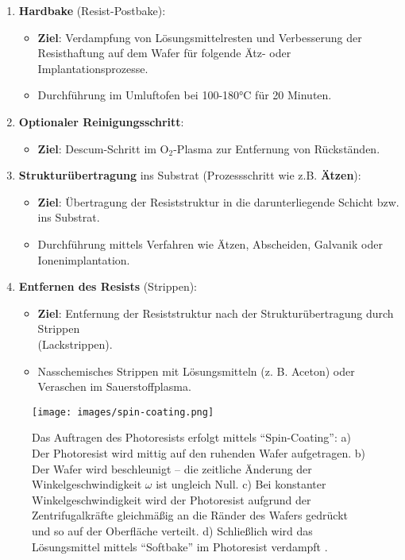 \documentclass{article} %
\begin{document}
\begin{enumerate}
    \item \textbf{Hardbake} (Resist-Postbake):
    \begin{itemize}
        \item \textbf{Ziel}: Verdampfung von Lösungsmittelresten und Verbesserung der Resisthaftung auf dem Wafer für folgende Ätz- oder Implantationsprozesse.
        \item Durchführung im Umluftofen bei 100-180°C für 20 Minuten.
    \end{itemize}

    \item \textbf{Optionaler Reinigungsschritt}:
    \begin{itemize}
        \item \textbf{Ziel}: Descum-Schritt im $\mathrm{O}_2$-Plasma zur Entfernung von Rückständen.
    \end{itemize}

    \item \textbf{Strukturübertragung} ins Substrat (Prozessschritt wie z.B. \textbf{Ätzen}):
    \begin{itemize}
        \item \textbf{Ziel}: Übertragung der Resiststruktur in die darunterliegende Schicht bzw. ins Substrat.
        \item Durchführung mittels Verfahren wie Ätzen, Abscheiden, Galvanik oder Ionenimplantation.
    \end{itemize}

    \item \textbf{Entfernen des Resists} (Strippen):
    \begin{itemize}
        \item \textbf{Ziel}: Entfernung der Resiststruktur nach der Strukturübertragung durch Strippen \\ (Lackstrippen).
        \item Nasschemisches Strippen mit Lösungsmitteln (z. B. Aceton) oder Veraschen im Sauerstoffplasma.
    \end{itemize}
\end{enumerate}

\begin{figure}[htb!]
    \centering
    \texttt{[image: images/spin-coating.png]} %
    \captionsetup{labelfont=bf, width=.75\textwidth} %
    \caption{Das Auftragen des Photoresists erfolgt mittels ``Spin-Coating'': a) Der Photoresist wird mittig auf den ruhenden Wafer aufgetragen. b) Der Wafer wird beschleunigt -- die zeitliche Änderung der Winkelgeschwindigkeit $\omega$ ist ungleich Null. c) Bei konstanter Winkelgeschwindigkeit wird der Photoresist aufgrund der Zentrifugalkräfte gleichmäßig an die Ränder des Wafers gedrückt und so auf der Oberfläche verteilt. d) Schließlich wird das Lösungsmittel mittels ``Softbake'' im Photoresist verdampft \cite{Sankapal2023}.}
    \label{fig:spin-coating}
\end{figure}
\end{document}

